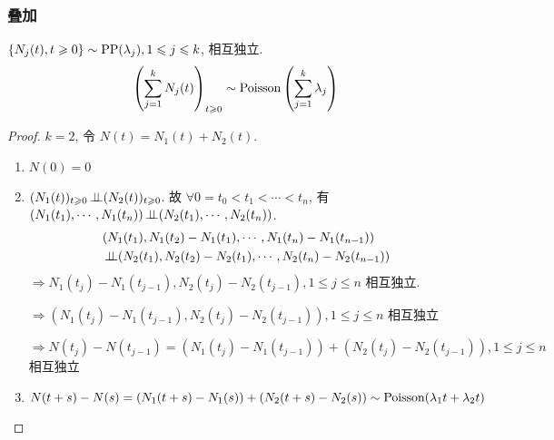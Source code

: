 \subsubsection{叠加}

\begin{theorem}
    $\{N_j(t),t\geqslant 0\}\sim \operatorname{PP}(\lambda_j), 1\leqslant j\leqslant k$, 相互独立.
    \begin{equation}
        \left(\sum_{j=1}^k N_j(t)\right)_{t\geqslant 0}\sim \operatorname{Poisson}\left(\sum_{j=1}^k\lambda_j\right)
    \end{equation}
\end{theorem}

\begin{proof}
    $k=2$, 令 $N(t)=N_1(t)+N_2(t)$.
    \begin{enumerate}
        \item $N(0)=0$
        \item $(N_1(t))_{t\geqslant 0}\operatorname{\perp\!\!\!\perp} (N_2(t))_{t\geqslant 0}$. 故 $\forall 0=t_0<t_1<\cdots<t_n$, 有 $(N_1(t_1),\cdots,N_1(t_n))\operatorname{\perp\!\!\!\perp} (N_2(t_1),\cdots,N_2(t_n))$.
        \[
        \begin{aligned}
            &(N_1(t_1),N_1(t_2)-N_1(t_1),\cdots,N_1(t_n)-N_1(t_{n-1}))\\
            &\operatorname{\perp\!\!\!\perp} (N_2(t_1),N_2(t_2)-N_2(t_1),\cdots,N_2(t_n)-N_2(t_{n-1}))
        \end{aligned}
        \]
        $\Rightarrow N_1(t_j)-N_1(t_{j-1}),N_2(t_j)-N_2(t_{j-1}), 1\leq j\leq n$ 相互独立.
        
        $\Rightarrow (N_1(t_j)-N_1(t_{j-1}), N_2(t_j)-N_2(t_{j-1})), 1\leq j\leq n$ 相互独立
        
        $\Rightarrow N(t_j)-N(t_{j-1})=(N_1(t_j)-N_1(t_{j-1}))+(N_2(t_j)-N_2(t_{j-1})), 1\leq j\leq n$ 相互独立
        \item $N(t+s)-N(s)=(N_1(t+s)-N_1(s))+(N_2(t+s)-N_2(s))\sim \operatorname{Poisson}(\lambda_1 t+\lambda_2 t)$
    \end{enumerate}
\end{proof}

